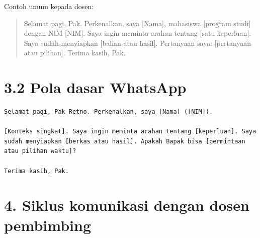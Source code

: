 \documentclass[
  indonesian,
]{article}
\renewcommand{\subsection}{\section}
\begin{document}
Contoh umum kepada dosen:

\begin{quote}
Selamat pagi, Pak. Perkenalkan, saya {[}Nama{]}, mahasiswa {[}program
studi{]} dengan NIM {[}NIM{]}. Saya ingin meminta arahan tentang {[}satu
keperluan{]}. Saya sudah menyiapkan {[}bahan atau hasil{]}. Pertanyaan
saya: {[}pertanyaan atau pilihan{]}. Terima kasih, Pak.
\end{quote}

\subsection{3.2 Pola dasar WhatsApp}\label{pola-dasar-whatsapp}

\begin{verbatim}
Selamat pagi, Pak Retno. Perkenalkan, saya [Nama] ([NIM]).

[Konteks singkat]. Saya ingin meminta arahan tentang [keperluan]. Saya sudah menyiapkan [berkas atau hasil]. Apakah Bapak bisa [permintaan atau pilihan waktu]?

Terima kasih, Pak.
\end{verbatim}

\section{4. Siklus komunikasi dengan dosen
pembimbing}\label{siklus-komunikasi-dengan-dosen-pembimbing}
\end{document}
